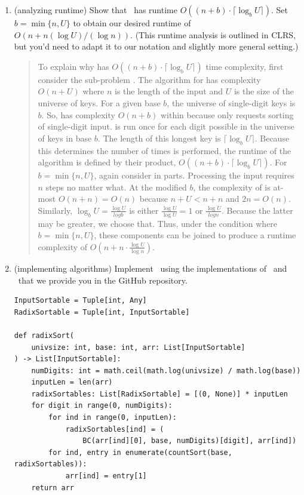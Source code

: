 \documentclass[11pt]{article}
\begin{document}
\begin{enumerate}
\begin{enumerate}
            
            \item (analyzing runtime) Show that \RadixSort\ has runtime $O((n+b)\cdot \lceil \log_b U\rceil)$.  Set $b=\min\{n,U\}$ to obtain our desired runtime of $O(n+n(\log U)/(\log n))$.  (This runtime analysis is outlined in CLRS, but you'd need to adapt it to our notation and slightly more general setting.) 
            
    \begin{quote}
        \color{purple}
        To explain why \RadixSort has $O((n+b)\cdot \lceil \log_b U\rceil)$ time complexity, first consider the sub-problem \CountingSort. The algorithm for \CountingSort has complexity $O(n + U)$ where $n$ is the length of the input and $U$ is the size of the universe of keys. For a given base $b$, the universe of single-digit keys is $b$. So, \CountingSort has complexity $O(n + b)$ within \RadixSort because \RadixSort only requests sorting of single-digit input. \CountingSort is run once for each digit possible in the universe of keys in base $b$. The length of this longest key is $\lceil \log_b U\rceil$. Because this determines the number of times \CountingSort is performed, the runtime of the algorithm is defined by their product, $O((n+b)\cdot \lceil \log_b U\rceil)$. \newline
        For $b = \min\{n, U\}$, again consider in parts. Processing the input requires $n$ steps no matter what. At the modified $b$, the complexity of \CountingSort is at-most $O(n + n) = O(n)$ because $n + U < n + n$ and $2n = O(n)$. Similarly, $\log_bU = \frac{\log U}{log b}$ is either $\frac{\log U}{\log U} = 1$ or $\frac{\log U}{log n}$. Because the latter may be greater, we choose that. Thus, under the condition where $b = \min\{n, U\}$, these components can be joined to produce a runtime complexity of $O(n + n \cdot \frac{\log U}{\log n})$.
    \end{quote}
            \item (implementing algorithms)
            Implement \RadixSort\ using the implementations of \CountingSort\ and \BC\ that we provide you in the GitHub repository. 

            \begin{verbatim}
InputSortable = Tuple[int, Any]
RadixSortable = Tuple[int, InputSortable]

def radixSort(
    univsize: int, base: int, arr: List[InputSortable]
) -> List[InputSortable]:
    numDigits: int = math.ceil(math.log(univsize) / math.log(base))
    inputLen = len(arr)
    radixSortables: List[RadixSortable] = [(0, None)] * inputLen
    for digit in range(0, numDigits):
        for ind in range(0, inputLen):
            radixSortables[ind] = (
                BC(arr[ind][0], base, numDigits)[digit], arr[ind])
        for ind, entry in enumerate(countSort(base, radixSortables)):
            arr[ind] = entry[1]
    return arr
            \end{verbatim}
  

\end{enumerate}
\end{enumerate}
\end{document}

